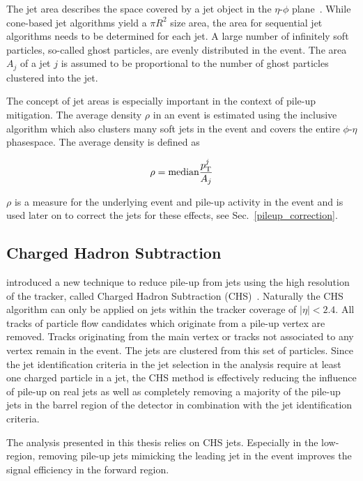 The jet area describes the space covered by a jet object in the $\eta$-$\phi$
plane~\cite{Cacciari:2008gn}. While cone-based jet algorithms yield a $\pi R^2$
size area, the area for sequential jet algorithms needs to be determined for
each jet. A large number of infinitely soft particles, so-called ghost
particles, are evenly distributed in the event. The area $A_j$ of a jet $j$ is
assumed to be proportional to the number of ghost particles clustered into the
jet. 

The concept of jet areas is especially important in the context of pile-up
mitigation. The average \pt density $\rho$ in an event is estimated using the inclusive
\kt algorithm which also clusters many soft jets in the event and covers the
entire $\phi$-$\eta$ phasespace. The average \pt density is defined as

\begin{equation*}
    \rho = \text{median} \frac{p_{\mathrm{T}}^j}{A_j}
\end{equation*}

$\rho$ is a measure for the underlying event and pile-up activity in the event
and is used later on to correct the jets for these effects, see
Sec.~\ref{pileup_correction}.

\subsection{Charged Hadron Subtraction}
\label{sec:chs_algorithm}

\CMS introduced a new technique to reduce pile-up from jets using the high
resolution of the tracker, called Charged Hadron Subtraction
(CHS)~\cite{Kirschenmann:2014dla}. Naturally the CHS algorithm can only be
applied on jets within the tracker coverage of $|\eta| < 2.4$. All tracks of
particle flow candidates which originate from a pile-up vertex are removed.
Tracks originating from the main vertex or tracks not associated to any vertex
remain in the event. The jets are clustered from this set of particles.
Since the jet identification criteria in the jet selection in the analysis
require at least one charged particle in a jet, the CHS method is effectively
reducing the influence of pile-up on real jets as well as completely removing a
majority of the pile-up jets in the barrel region of the \CMS detector in
combination with the jet identification criteria.

The analysis presented in this thesis relies on CHS jets. Especially in the
low-\pt region, removing pile-up jets mimicking the leading jet in the event
improves the signal efficiency in the forward region.

